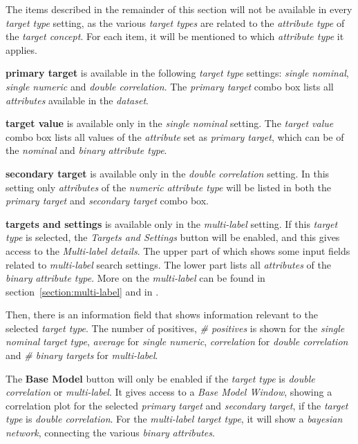 \documentclass{article}
\begin{document}
The items described in the remainder of this section will not be available in every \emph{target type} setting, as the various \emph{target types} are related to the \emph{attribute type} of the \emph{target concept}.
For each item, it will be mentioned to which \emph{attribute type} it applies.

\textbf{primary target} is available in the following \emph{target type} settings: \emph{single nominal}, \emph{single numeric} and \emph{double correlation}.
The \emph{primary target} combo box lists all \emph{attributes} available in the \emph{dataset}.

\textbf{target value} is available only in the \emph{single nominal} setting.
The \emph{target value} combo box lists all values of the \emph{attribute} set as \emph{primary target}, which can be of the \emph{nominal} and \emph{binary} \emph{attribute type}.

\textbf{secondary target} is available only in the \emph{double correlation} setting.
In this setting only \emph{attributes} of the \emph{numeric} \emph{attribute type} will be listed in both the \emph{primary target} and \emph{secondary target} combo box.

\textbf{targets and settings} is available only in the \emph{multi-label} setting.
If this \emph{target type} is selected, the \emph{Targets and Settings} button will be enabled, and this gives access to the \emph{Multi-label details}.
The upper part of which shows some input fields related to \emph{multi-label} search settings.
The lower part lists all \emph{attributes} of the \emph{binary} \emph{attribute type}.
More on the \emph{multi-label} can be found in section~\ref{section:multi-label} and in \cite{emm,sdmbn}.

Then, there is an information field that shows information relevant to the selected \emph{target type}.
The number of positives, \emph{\# positives} is shown for the \emph{single nominal} \emph{target type}, \emph{average} for \emph{single numeric}, \emph{correlation} for \emph{double correlation} and \emph{\# binary targets} for \emph{multi-label}.

The \textbf{Base Model} button will only be enabled if the \emph{target type} is \emph{double correlation} or \emph{multi-label}.
It gives access to a \emph{Base Model Window}, showing a correlation plot for the selected \emph{primary target} and \emph{secondary target}, if the \emph{target type} is \emph{double correlation}.
For the \emph{multi-label} \emph{target type}, it will show a \emph{bayesian network}, connecting the various \emph{binary} \emph{attributes}.
\end{document}
